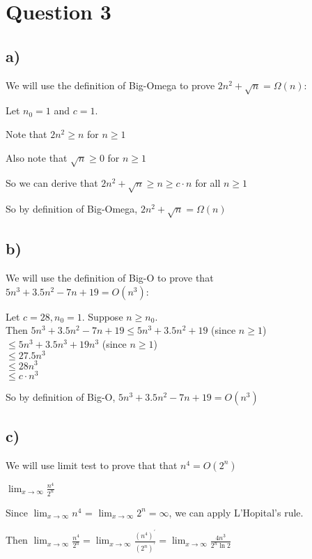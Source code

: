 \documentclass{article}
\begin{document}

\section*{Question 3}

\subsection*{a)}
We will use the definition of Big-Omega to prove $2n^2+\sqrt{n} = \Omega(n)$:

Let $n_0 = 1$ and $c = 1$.

Note that $ 2n^2 \geq n$ for $n \geq 1$

Also note that $\sqrt{n} \geq 0$ for $n \geq 1$

So we can derive that $2n^2+\sqrt{n} \geq n \geq c \cdot n$ for all $n \geq 1$

So by definition of Big-Omega, $2n^2+\sqrt{n} = \Omega(n)$

\subsection*{b)}
We will use the definition of Big-O to prove that $5n^3+3.5n^2-7n+19 = O(n^3)$:

Let $c = 28, n_0 = 1$. Suppose $n \geq n_0$.
\\ Then  $5n^3+3.5n^2-7n+19 \leq 5n^3 + 3.5n^2+19$ (since $n \geq 1$)
\\ $\leq 5n^3 + 3.5n^3 + 19n^3$ (since $n \geq 1$)
\\ $\leq 27.5n^3$
\\ $\leq 28n^3$
\\ $\leq c \cdot n^3$

So by definition of Big-O, $5n^3+3.5n^2-7n+19 = O(n^3)$

\subsection*{c)}
We will use limit test to prove that that $n^4 = O(2^n)$

$\lim_{x \to \infty} \frac{n^4}{2^n}$

Since $\lim_{x \to \infty} n^4$ = $\lim_{x \to \infty} 2^n = \infty$, we can apply L'Hopital's rule.

Then $\lim_{x \to \infty} \frac{n^4}{2^n} = \lim_{x \to \infty} \frac{(n^4)^\prime}{(2^n)^\prime} =  \lim_{x \to \infty} \frac{4n^3}{2^n \ln 2}$
\end{document}
